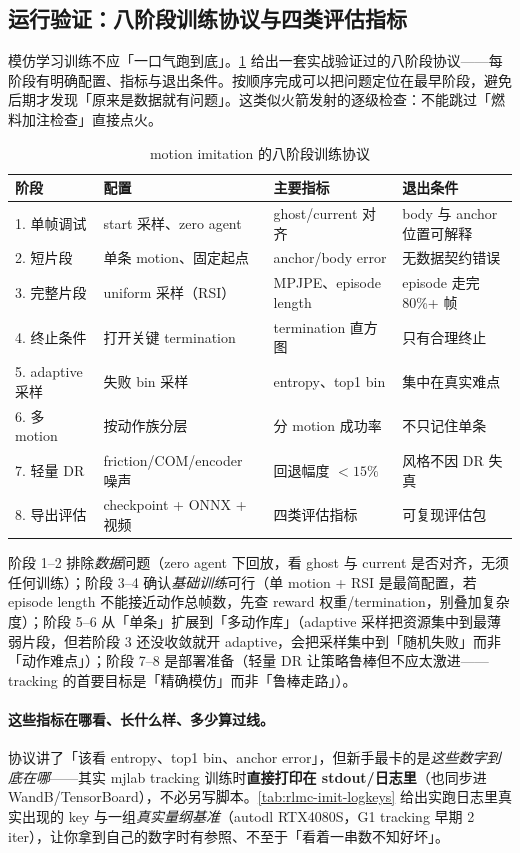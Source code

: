 \subsection{运行验证：八阶段训练协议与四类评估指标}
\label{sec:rlmc-imit-track-protocol}

模仿学习训练不应「一口气跑到底」。\cref{tab:rlmc-imit-protocol} 给出一套实战验证过的八阶段协议——每阶段有明确配置、指标与退出条件。按顺序完成可以把问题定位在最早阶段，避免后期才发现「原来是数据就有问题」。这类似火箭发射的逐级检查：不能跳过「燃料加注检查」直接点火。

\begin{table}[ht]
\centering
\small
\caption{motion imitation 的八阶段训练协议}
\label{tab:rlmc-imit-protocol}
\begin{tabular}{@{}llll@{}}
\toprule
阶段 & 配置 & 主要指标 & 退出条件 \\
\midrule
1. 单帧调试 & start 采样、zero agent & ghost/current 对齐 & body 与 anchor 位置可解释 \\
2. 短片段 & 单条 motion、固定起点 & anchor/body error & 无数据契约错误 \\
3. 完整片段 & uniform 采样（RSI） & MPJPE、episode length & episode 走完 80\%+ 帧 \\
4. 终止条件 & 打开关键 termination & termination 直方图 & 只有合理终止 \\
5. adaptive 采样 & 失败 bin 采样 & entropy、top1 bin & 集中在真实难点 \\
6. 多 motion & 按动作族分层 & 分 motion 成功率 & 不只记住单条 \\
7. 轻量 DR & friction/COM/encoder 噪声 & 回退幅度 $<15\%$ & 风格不因 DR 失真 \\
8. 导出评估 & checkpoint + ONNX + 视频 & 四类评估指标 & 可复现评估包 \\
\bottomrule
\end{tabular}
\end{table}

阶段 1--2 排除\emph{数据}问题（zero agent 下回放，看 ghost 与 current 是否对齐，无须任何训练）；阶段 3--4 确认\emph{基础训练}可行（单 motion + RSI 是最简配置，若 episode length 不能接近动作总帧数，先查 reward 权重/termination，别叠加复杂度）；阶段 5--6 从「单条」扩展到「多动作库」（adaptive 采样把资源集中到最薄弱片段，但若阶段 3 还没收敛就开 adaptive，会把采样集中到「随机失败」而非「动作难点」）；阶段 7--8 是部署准备（轻量 DR 让策略鲁棒但不应太激进——tracking 的首要目标是「精确模仿」而非「鲁棒走路」）。

\paragraph{这些指标在哪看、长什么样、多少算过线。}协议讲了「该看 entropy、top1 bin、anchor error」，但新手最卡的是\emph{这些数字到底在哪}——其实 mjlab tracking 训练时\textbf{直接打印在 stdout/日志里}（也同步进 WandB/TensorBoard），不必另写脚本。\cref{tab:rlmc-imit-logkeys} 给出实跑日志里真实出现的 key 与一组\emph{真实量纲基准}（autodl RTX4080S，G1 tracking 早期 2 iter），让你拿到自己的数字时有参照、不至于「看着一串数不知好坏」。

